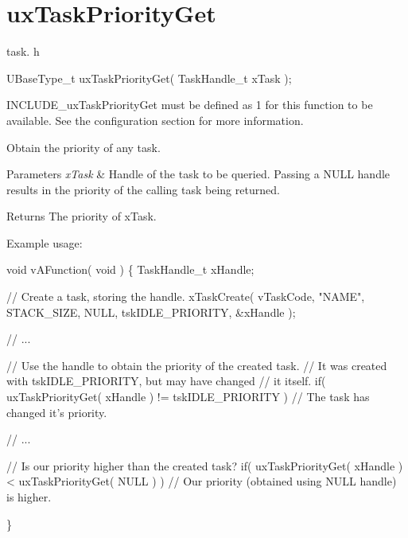 \hypertarget{group__ux_task_priority_get}{}\section{ux\+Task\+Priority\+Get}
\label{group__ux_task_priority_get}
task. h 
\begin{DoxyPre}UBaseType\_t uxTaskPriorityGet( TaskHandle\_t xTask );\end{DoxyPre}


I\+N\+C\+L\+U\+D\+E\+\_\+ux\+Task\+Priority\+Get must be defined as 1 for this function to be available. See the configuration section for more information.

Obtain the priority of any task.


\begin{DoxyParams}{Parameters}
{\em x\+Task} & Handle of the task to be queried. Passing a N\+U\+LL handle results in the priority of the calling task being returned.\\
\hline
\end{DoxyParams}
\begin{DoxyReturn}{Returns}
The priority of x\+Task.
\end{DoxyReturn}
Example usage\+: 
\begin{DoxyPre}
void vAFunction( void )
\{
TaskHandle\_t xHandle;
\begin{DoxyVerb}// Create a task, storing the handle.
xTaskCreate( vTaskCode, "NAME", STACK_SIZE, NULL, tskIDLE_PRIORITY, &xHandle );

// ...

// Use the handle to obtain the priority of the created task.
// It was created with tskIDLE_PRIORITY, but may have changed
// it itself.
if( uxTaskPriorityGet( xHandle ) != tskIDLE_PRIORITY )
{
 // The task has changed it's priority.
}

// ...

// Is our priority higher than the created task?
if( uxTaskPriorityGet( xHandle ) < uxTaskPriorityGet( NULL ) )
{
 // Our priority (obtained using NULL handle) is higher.
}
\end{DoxyVerb}

\}
  \end{DoxyPre}
 